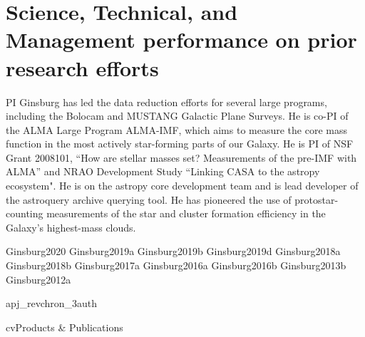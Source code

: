 \documentclass[12pt]{article}
\begin{document}
%


\section*{Science, Technical, and Management performance on prior research efforts}
PI Ginsburg has led the data reduction efforts for several large programs, including
the Bolocam and MUSTANG Galactic Plane Surveys.  He is co-PI of the ALMA Large Program
ALMA-IMF, which aims to measure the core mass function in the most actively star-forming
parts of our Galaxy.
He is PI of NSF Grant 2008101, ``How are stellar masses set? Measurements of the pre-IMF with ALMA''
and NRAO Development Study ``Linking CASA to the astropy ecosystem".
He is on the astropy core development team and is lead developer of the astroquery
archive querying tool.  
He has pioneered the use of protostar-counting measurements of the star and cluster
formation efficiency in the Galaxy's highest-mass clouds.



\nocite{biba}{Ginsburg2020}
\nocite{biba}{Ginsburg2019a}
\nocite{biba}{Ginsburg2019b}
\nocite{biba}{Ginsburg2019d}
\nocite{biba}{Ginsburg2018a}
\nocite{biba}{Ginsburg2018b}
\nocite{biba}{Ginsburg2017a}
\nocite{biba}{Ginsburg2016a}
\nocite{biba}{Ginsburg2016b}
\nocite{biba}{Ginsburg2013b}
\nocite{biba}{Ginsburg2012a}

{apj_revchron_3auth}
%
%
%


{cv}{Products \& Publications}

\vfill  
\nopagebreak



%
\end{document}

